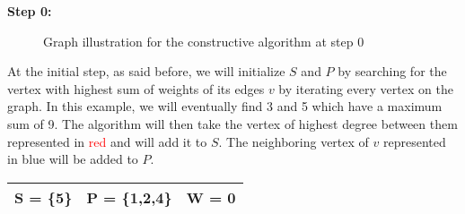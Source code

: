     \begin{minipage}{\linewidth}
        \textbf{Step 0:} \newline
        \begin{minipage}{0.4\textwidth}
            \begin{figure}[H]
                \centering
                \caption{Graph illustration for the constructive algorithm at step 0}
                \label{fig:constructive-mewc-edge}
            \end{figure}
        \end{minipage}
        \begin{minipage}{0.6\textwidth}
            At the initial step, as said before, we will initialize $S$ and $P$ by searching for the vertex with highest sum of weights of its edges $v$ by iterating every vertex on the graph. In this example, we will eventually find 3 and 5 which have a maximum sum of 9. The algorithm will then take the vertex of highest degree between them represented in \textcolor{red}{red} and will add it to $S$. The neighboring vertex of $v$ represented in \textcolor{Cerulean}{blue} will be added to $P$.
    
            \begin{center}
                \begin{tabular}{|lll|}
                    \hline
                    S = \{5\} & P = \{1,2,4\} & W = 0 \\
                    \hline
                \end{tabular}
            \end{center}
        \end{minipage}
    \end{minipage} 
    
